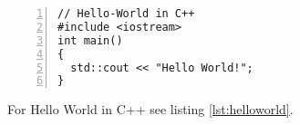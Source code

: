 \documentclass[a4paper, 12pt]{article}
\begin{document}
\begin{lstlisting}[numbers=left,caption=Hello world in C++.,label=lst:helloworld]
// Hello-World in C++
#include <iostream>
int main()
{
  std::cout << "Hello World!";
}
\end{lstlisting}
For Hello World in C++ see listing \ref{lst:helloworld}.
\end{document}
